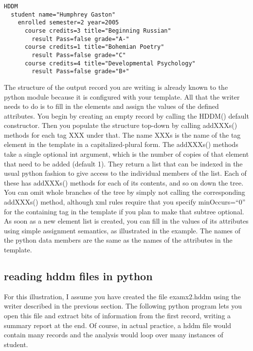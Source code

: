 \documentclass{revtex4}
\begin{document}
\vspace{1cm}
\begin{minipage}{12cm}
\begin{verbatim}
HDDM
  student name="Humphrey Gaston"
    enrolled semester=2 year=2005
      course credits=3 title="Beginning Russian"
        result Pass=false grade="A-"
      course credits=1 title="Bohemian Poetry"
        result Pass=false grade="C"
      course credits=4 title="Developmental Psychology"
        result Pass=false grade="B+"
\end{verbatim}
\end{minipage}
\vspace{1cm}

The structure of the output record you are writing is already known to
the python module because it is configured with your template. All that
the writer needs to do is to fill in the elements and assign the values
of the defined attributes. You begin by creating an empty record by calling
the HDDM() default constructor. Then you populate the structure top-{}down
by calling addXXXs() methods for each tag XXX under that. The name XXXs
is the name of the tag element in the template in a capitalized-{}plural 
form. The addXXXs() methods take a single optional int argument, which
is the number of copies of that element that need to be added (default 1).
They return a list that can be indexed in the usual python fashion to give
access to the individual members of the list. Each of these has addXXXs()
methods for each of its contents, and so on down the tree. You can omit
whole branches of the tree by simply not calling the corresponding 
addXXXs() method, although xml rules require that you specify minOccurs=``0''
for the containing tag in the template if you plan to make that subtree
optional. As soon as a new element list is created, you can fill in the
values of its attributes using simple assignment semantics, as illustrated
in the example. The names of the python data members are the same as the
names of the attributes in the template.

\subsection{reading hddm files in python}

For this illustration, I assume you have created the file examx2.hddm using
the writer described in the previous section. The following python program
lets you open this file and extract bits of information from the first record,
writing a summary report at the end. Of course, in actual practice, a hddm
file would contain many records and the analysis would loop over many instances
of student.
\end{document}
